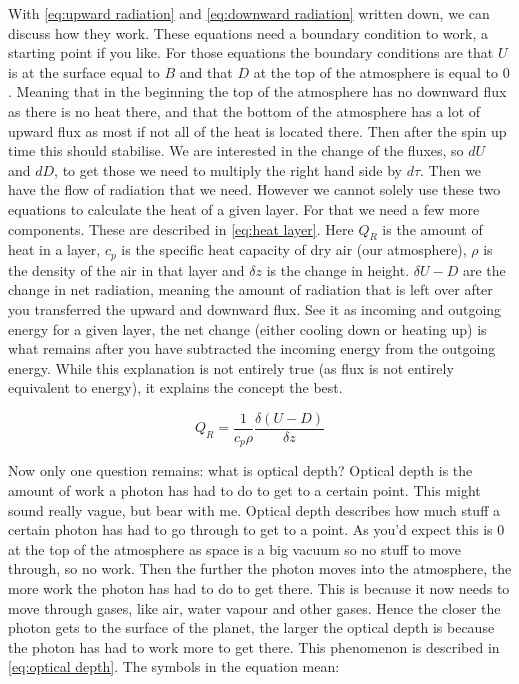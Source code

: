 With \autoref{eq:upward radiation} and \autoref{eq:downward radiation} written down, we can discuss how they work. These equations need a boundary condition to work, a starting point if you like.
For those equations the boundary conditions are that $U$ is at the surface equal to $B$ and that $D$ at the top of the atmosphere is equal to $0$. Meaning that in the beginning the top of the 
atmosphere has no downward flux as there is no heat there, and that the bottom of the atmosphere has a lot of upward flux as most if not all of the heat is located there. Then after the spin up 
time this should stabilise. We are interested in the change of the fluxes, so $dU$ and $dD$, to get those we need to multiply the right hand side by $d\tau$. Then we have the flow of radiation
that we need. However we cannot solely use these two equations to calculate the heat of a given layer. For that we need a few more components. These are described in \autoref{eq:heat layer}. 
Here $Q_R$ is the amount of heat in a layer, $c_p$ is the specific heat capacity of dry air (our atmosphere), $\rho$ is the density of the air in that layer and $\delta z$ is the change in height. 
$\delta U - D$ are the change in net radiation, meaning the amount of radiation that is left over after you transferred the upward and downward flux. See it as incoming and outgoing energy for a 
given layer, the net change (either cooling down or heating up) is what remains after you have subtracted the incoming energy from the outgoing energy. While this explanation is not entirely true 
(as flux is not entirely equivalent to energy), it explains the concept the best.

\begin{equation}
    Q_R = \frac{1}{c_p\rho}\frac{\delta(U - D)}{\delta z}
    \label{eq:heat layer}
\end{equation}

Now only one question remains: what is optical depth? Optical depth is the amount of work a photon has had to do to get to a certain point. This might sound really vague, but bear with me. 
Optical depth describes how much stuff a certain photon has had to go through to get to a point. As you'd expect this is $0$ at the top of the atmosphere as space is a big vacuum so no stuff to 
move through, so no work. Then the further the photon moves into the atmosphere, the more work the photon has had to do to get there. This is because it now needs to move through gases, like air,
water vapour and other gases. Hence the closer the photon gets to the surface of the planet, the larger the optical depth is because the photon has had to work more to get there. This phenomenon
is described in \autoref{eq:optical depth}. The symbols in the equation mean:

